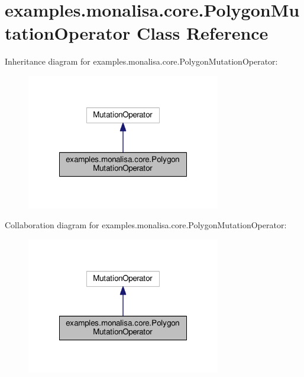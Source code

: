 \hypertarget{classexamples_1_1monalisa_1_1core_1_1_polygon_mutation_operator}{\section{examples.\-monalisa.\-core.\-Polygon\-Mutation\-Operator Class Reference}
\label{classexamples_1_1monalisa_1_1core_1_1_polygon_mutation_operator}
}


Inheritance diagram for examples.\-monalisa.\-core.\-Polygon\-Mutation\-Operator\-:
\nopagebreak
\begin{figure}[H]
\begin{center}
\leavevmode
\includegraphics[width=240pt]{classexamples_1_1monalisa_1_1core_1_1_polygon_mutation_operator__inherit__graph}
\end{center}
\end{figure}


Collaboration diagram for examples.\-monalisa.\-core.\-Polygon\-Mutation\-Operator\-:
\nopagebreak
\begin{figure}[H]
\begin{center}
\leavevmode
\includegraphics[width=240pt]{classexamples_1_1monalisa_1_1core_1_1_polygon_mutation_operator__coll__graph}
\end{center}
\end{figure}
